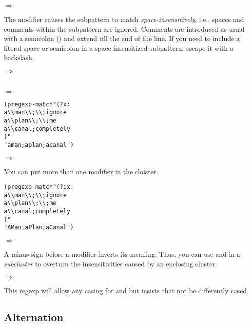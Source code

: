  $\Rightarrow$

The modifier  causes the subpattern to match
\emph{space-insensitively}, i.e., spaces and comments within the
subpattern are ignored.  Comments are introduced as usual with a
semicolon (\code{;}) and extend till the end of the line.  If you need
to include a literal space or semicolon in a space-insensitized
subpattern, escape it with a backslash.

 $\Rightarrow$

 \\
$\Rightarrow$ 

\begin{alltt}
(pregexp-match "(?x:
   a {\textbackslash\textbackslash} man  {\textbackslash\textbackslash}; {\textbackslash\textbackslash}   ; ignore
   a {\textbackslash\textbackslash} plan {\textbackslash\textbackslash}; {\textbackslash\textbackslash}   ; me
   a {\textbackslash\textbackslash} canal         ; completely
   )"
 "a man; a plan; a canal")
\end{alltt}\antipar
$\Rightarrow$ 

You can put more than one modifier in the cloister.

\begin{alltt}
(pregexp-match "(?ix:
   a {\textbackslash\textbackslash} man  {\textbackslash\textbackslash}; {\textbackslash\textbackslash}   ; ignore
   a {\textbackslash\textbackslash} plan {\textbackslash\textbackslash}; {\textbackslash\textbackslash}   ; me
   a {\textbackslash\textbackslash} canal         ; completely
   )"
 "A Man; a Plan; a Canal")
\end{alltt}\antipar
$\Rightarrow$ 

A minus sign before a modifier inverts its meaning.  Thus, you can use
 and  in a {\em subcluster} to overturn the
insensitivities caused by an enclosing cluster.

$\Rightarrow$ 

This regexp will allow any casing for  and  but
insists that  not be differently cased.

\subsection {Alternation}\label{sec:pregexp-alternation}

